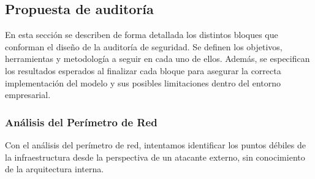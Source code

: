 \documentclass[a4paper, 10pt]{article}
\begin{document}
\clearpage

\subsection{Propuesta de auditoría}

En esta sección se describen de forma detallada los distintos bloques que conforman el diseño de la auditoría de seguridad. Se definen los objetivos, herramientas 
y metodología a seguir en cada uno de ellos. Además, se especifican los resultados esperados al finalizar cada bloque para asegurar la correcta implementación del modelo y sus posibles limitaciones
 dentro del entorno empresarial.


\subsubsection{Análisis del Perímetro de Red}

Con el análisis del perímetro de red, intentamos identificar los puntos débiles de la infraestructura desde la perspectiva de un atacante externo, sin conocimiento de la arquitectura interna.
\end{document}
